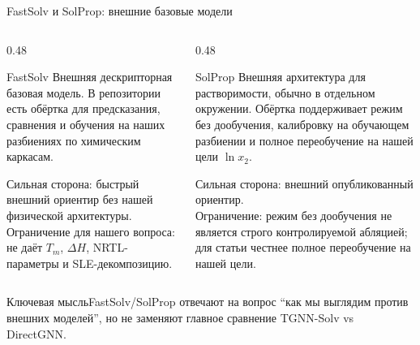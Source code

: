 \documentclass[aspectratio=169,10pt]{beamer}
\newcommand{\keybox}[1]{\begin{block}{Ключевая мысль}#1\end{block}}
\begin{document}
\begin{frame}{FastSolv и SolProp: внешние базовые модели}
  \small
  \begin{columns}[T,onlytextwidth]
    \begin{column}{0.48\textwidth}
      \begin{block}{FastSolv}
        \scriptsize
        Внешняя дескрипторная базовая модель. В репозитории есть обёртка для предсказания, сравнения и обучения на наших разбиениях по химическим каркасам.
        \vspace{0.25em}

        Сильная сторона: быстрый внешний ориентир без нашей физической архитектуры.\\
        Ограничение для нашего вопроса: не даёт $T_m$, $\Delta H$, NRTL-параметры и SLE-декомпозицию.
      \end{block}
    \end{column}
    \begin{column}{0.48\textwidth}
      \begin{block}{SolProp}
        \scriptsize
        Внешняя архитектура для растворимости, обычно в отдельном окружении. Обёртка поддерживает режим без дообучения, калибровку на обучающем разбиении и полное переобучение на нашей цели $\ln x_2$.
        \vspace{0.25em}

        Сильная сторона: внешний опубликованный ориентир.\\
        Ограничение: режим без дообучения не является строго контролируемой абляцией; для статьи честнее полное переобучение на нашей цели.
      \end{block}
    \end{column}
  \end{columns}
  \vspace{0.35em}
  \keybox{FastSolv/SolProp отвечают на вопрос “как мы выглядим против внешних моделей”, но не заменяют главное сравнение TGNN-Solv vs DirectGNN.}
\end{frame}
\end{document}
